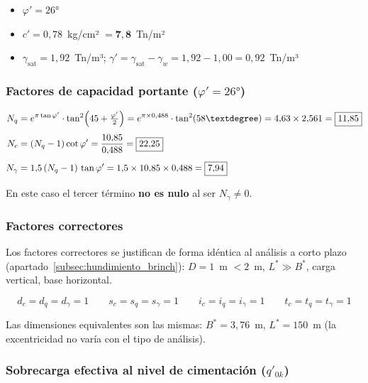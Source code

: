 \begin{supuestobox}
  \begin{itemize}
    \item $\varphi' = 26°$
    \item $c' = 0{,}78$~kg/cm² $= \mathbf{7{,}8}$~Tn/m²
    \item $\gamma_{\text{sat}} = 1{,}92$~Tn/m³;
          $\gamma' = \gamma_{\text{sat}} - \gamma_w = 1{,}92 - 1{,}00
          = 0{,}92$~Tn/m³
  \end{itemize}
\end{supuestobox}

\subsubsection{Factores de capacidad portante ($\varphi' = 26°$)}

\begin{align}
  N_q &= e^{\pi\tan\varphi'}\cdot\tan^2\!\left(45+\tfrac{\varphi'}{2}\right)
       = e^{\pi\times 0{,}488}\cdot\tan^2(58°)
       = 4{,}63 \times 2{,}561 = \resultado{11{,}85}
       \label{eq:Nq_LP} \\[4pt]
  N_c &= (N_q - 1)\cot\varphi'
       = \frac{10{,}85}{0{,}488} = \resultado{22{,}25}
       \label{eq:Nc_LP} \\[4pt]
  N_\gamma &= 1{,}5\,(N_q - 1)\,\tan\varphi'
            = 1{,}5 \times 10{,}85 \times 0{,}488
            = \resultado{7{,}94}
       \label{eq:Ng_LP}
\end{align}

En este caso el tercer término \textbf{no es nulo} al ser $N_\gamma \neq 0$.

\subsubsection{Factores correctores}

Los factores correctores se justifican de forma idéntica al análisis a corto
plazo (apartado~\ref{subsec:hundimiento_brinch}): $D = 1$~m $< 2$~m,
$L^* \gg B^*$, carga vertical, base horizontal.

\[
  d_c = d_q = d_\gamma = 1 \qquad
  s_c = s_q = s_\gamma = 1 \qquad
  i_c = i_q = i_\gamma = 1 \qquad
  t_c = t_q = t_\gamma = 1
\]

Las dimensiones equivalentes son las mismas: $B^* = 3{,}76$~m,
$L^* = 150$~m (la excentricidad no varía con el tipo de análisis).

\subsubsection{Sobrecarga efectiva al nivel de cimentación ($q'_{0k}$)}

